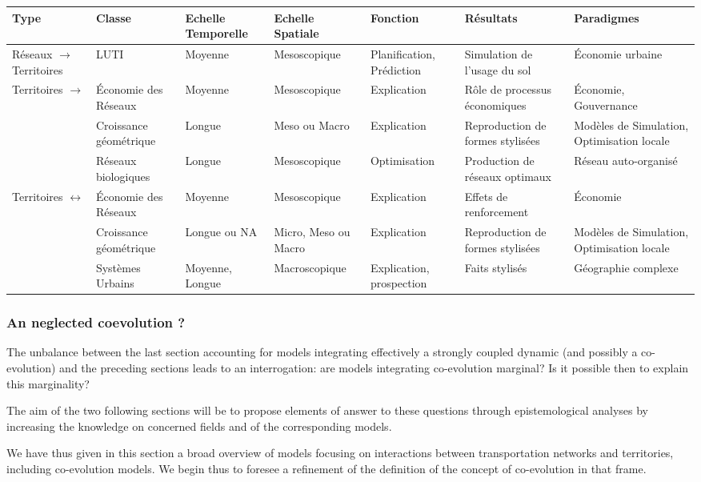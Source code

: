 \documentclass[galley]{jtlu-article-2col}
\begin{document}
\begin{table}
{\begin{tabular}{|p{2.5cm}|p{2cm}|p{2.5cm}|p{2.5cm}|p{2.1cm}|p{2.2cm}|p{2cm}|}
\hline
Type & Classe & Echelle Temporelle & Echelle Spatiale & Fonction & Résultats & Paradigmes\\ \hline
Réseaux $\rightarrow$ Territoires & LUTI & Moyenne & Mesoscopique & Planification, Prédiction & Simulation de l'usage du sol & Économie urbaine \\ \hline
\multirow{3}{*}{Territoires $\rightarrow$}& Économie des Réseaux & Moyenne & Mesoscopique & Explication & Rôle de processus économiques & Économie, Gouvernance\\\cline{2-7}
Réseaux& Croissance géométrique & Longue & Meso ou Macro & Explication & Reproduction de formes stylisées & Modèles de Simulation, Optimisation locale \\\cline{2-7}
& Réseaux biologiques & Longue & Mesoscopique & Optimisation & Production de réseaux optimaux & Réseau auto-organisé \\ \hline
\multirow{2}{*}{Territoires $\leftrightarrow$}& Économie des Réseaux & Moyenne & Mesoscopique & Explication & Effets de renforcement & Économie\\\cline{2-7}
Réseaux & Croissance géométrique & Longue ou NA & Micro, Meso ou Macro & Explication & Reproduction de formes stylisées & Modèles de Simulation, Optimisation locale \\\cline{2-7}
& Systèmes Urbains & Moyenne, Longue & Macroscopique & Explication, prospection & Faits stylisés & Géographie complexe\\\hline
\end{tabular}
}
\end{table}



\subsubsection*{An neglected coevolution ?}

The unbalance between the last section accounting for models integrating effectively a strongly coupled dynamic (and possibly a co-evolution) and the preceding sections leads to an interrogation: are models integrating co-evolution marginal? Is it possible then to explain this marginality?


The aim of the two following sections will be to propose elements of answer to these questions through epistemological analyses by increasing the knowledge on concerned fields and of the corresponding models.


We have thus given in this section a broad overview of models focusing on interactions between transportation networks and territories, including co-evolution models. We begin thus to foresee a refinement of the definition of the concept of co-evolution in that frame.
\end{document}
